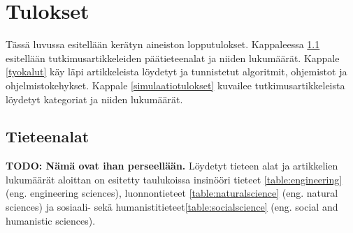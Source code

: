 \documentclass[utf8]{gradu3}
\begin{document}
\begin{table}[]
\centering
{}
\caption{Testauserän kategoriat}
\label{table: testausera}
\end{table}

\chapter{Tulokset}
Tässä luvussa esitellään kerätyn aineiston lopputulokset. Kappaleessa \ref{tieteenalat} esitellään tutkimusartikkeleiden päätieteenalat ja niiden lukumäärät. Kappale \ref{tyokalut} käy läpi artikkeleista löydetyt ja tunnistetut algoritmit, ohjemistot ja ohjelmistokehykset. Kappale \ref{simulaatiotulokset} kuvailee tutkimusartikkeleista löydetyt kategoriat ja niiden lukumäärät.

\section{Tieteenalat} \label{tieteenalat}
\textbf{TODO: Nämä ovat ihan perseellään.}
Löydetyt tieteen alat ja artikkelien lukumäärät aloittan on esitetty taulukoissa insinööri tieteet \ref{table:engineering} (eng. engineering sciences), luonnontieteet \ref{table:naturalscience} (eng. natural sciences) ja sosiaali- sekä humanistitieteet\ref{table:socialscience} (eng. social and humanistic sciences).
\end{document}
